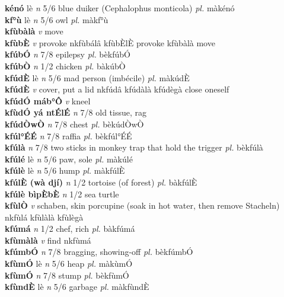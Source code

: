 \documentclass{article}
\begin{document}
{\bf kénó} lè {\it n} 5/6 blue duiker (Cephalophus monticola) {\it pl.} màkénó         \\ 
{\bf kf°ù} lè {\it n} 5/6 owl {\it pl.} màkf°ù         \\ 
{\bf kfùbàlà}  {\it v} move         \\ 
{\bf kfùbÈ}  {\it v} provoke   nkfùbálâ kfùbÈlÈ provoke  kfùbàlà move   \\ 
{\bf kfúbÓ}  {\it n} 7/8 epilepsy {\it pl.} bèkfúbÓ         \\ 
{\bf kfúbÒ}  {\it n} 1/2 chicken {\it pl.} bàkúbÒ         \\ 
{\bf kfúdÈ} lè {\it n} 5/6 mad person (imbécile) {\it pl.} màkúdÈ         \\ 
{\bf kfúdÈ}  {\it v} cover, put a lid   nkfúdâ   kfúdàlà kfúdègà close oneself  \\ 
{\bf kfúdÓ máb°Ô}  {\it v} kneel         \\ 
{\bf kfùdÓ yá ntÉlÉ}  {\it n} 7/8 old tissue, rag         \\ 
{\bf kfúdÒwÒ}  {\it n} 7/8 chest {\it pl.} bèkúdÒwÒ         \\ 
{\bf kfúl°ÉÉ}  {\it n} 7/8 raffia {\it pl.} bèkfúl°ÉÉ         \\ 
{\bf kfúlà}  {\it n} 7/8 two sticks in monkey trap that hold the trigger {\it pl.} bèkfúlà         \\ 
{\bf kfúlé} lè {\it n} 5/6 paw, sole {\it pl.} màkúlé         \\ 
{\bf kfúlè} lè {\it n} 5/6 hump {\it pl.} màkfúlÈ         \\ 
{\bf kfúlÈ (wà djí)}  {\it n} 1/2 tortoise (of forest) {\it pl.} bàkfúlÈ         \\ 
{\bf kfúlè bìpÈbÈ}  {\it n} 1/2 sea turtle         \\ 
{\bf kfùlÒ}  {\it v} schaben, skin porcupine (soak in hot water, then remove Stacheln)   nkfùlá   kfùlàlà kfùlègà  \\ 
{\bf kfúmá}  {\it n} 1/2 chef, rich {\it pl.} bàkfúmá         \\ 
{\bf kfùmàlà}  {\it v} find   nkfùmá      \\ 
{\bf kfúmbÓ}  {\it n} 7/8 bragging, showing-off {\it pl.} bèkfúmbÓ         \\ 
{\bf kfùmÓ} lè {\it n} 5/6 heap {\it pl.} màkùmÓ         \\ 
{\bf kfùmÓ}  {\it n} 7/8 stump {\it pl.}  bèkfùmÓ         \\ 
{\bf kfùndÈ} lè {\it n} 5/6 garbage {\it pl.} màkfùndÈ         \\ 
\end{document}
